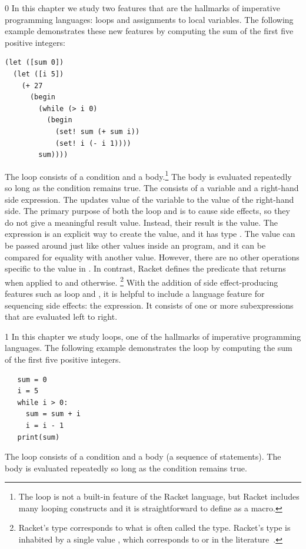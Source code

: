 \documentclass[7x10]{TimesAPriori_MIT}%
\def\racketEd{0}
\def\pythonEd{1}
\def\edition{1}
\newcommand{\pythonColor}[0]{}
\numberwithin{theorem}{chapter}
\numberwithin{definition}{chapter}
\numberwithin{equation}{chapter}
\begin{document}
{\if\edition\racketEd
%
In this chapter we study two features that are the hallmarks of
imperative programming languages: loops and assignments to local
variables. The following example demonstrates these new features by
computing the sum of the first five positive integers:
\begin{lstlisting}
(let ([sum 0])
  (let ([i 5])
    (+ 27
      (begin
        (while (> i 0)
          (begin
            (set! sum (+ sum i))
            (set! i (- i 1))))
        sum))))
\end{lstlisting}
The  loop consists of a condition and a
body.\footnote{The  loop is not a built-in
feature of the Racket language, but Racket includes many looping
constructs and it is straightforward to define  as a
macro.} The body is evaluated repeatedly so long as the condition
remains true.
%
The  consists of a variable and a right-hand side
expression.  The  updates value of the variable to the
value of the right-hand side.
%
The primary purpose of both the  loop and  is
to cause side effects, so they do not give a meaningful result
value. Instead, their result is the  value.  The
expression  is an explicit way to create the
 value, and it has type .  The
 value can be passed around just like other values
inside an \LangLoop{} program, and it can be compared for equality with
another  value. However, there are no other operations
specific to the  value in \LangLoop{}. In contrast,
Racket defines the   predicate that returns 
when applied to  and  otherwise.%
%
\footnote{Racket's  type corresponds to what is often
  called the  type. Racket's  type is inhabited
  by a single value , which corresponds to 
  or \code{()} in the literature~\citep{Pierce:2002hj}.}
%
With the addition of side effect-producing features such as
 loop and , it is helpful to include a language
feature for sequencing side effects: the  expression. It
consists of one or more subexpressions that are evaluated
left to right.
%
\fi}

{\if\edition\pythonEd\pythonColor
%
In this chapter we study loops, one of the hallmarks of imperative
programming languages. The following example demonstrates the
 loop by computing the sum of the first five positive
integers.
\begin{lstlisting}
   sum = 0
   i = 5
   while i > 0:
     sum = sum + i
     i = i - 1
   print(sum)
\end{lstlisting}
The  loop consists of a condition and a body (a sequence
of statements). The body is evaluated repeatedly so long as the
condition remains true.
%
\fi}
\end{document}
